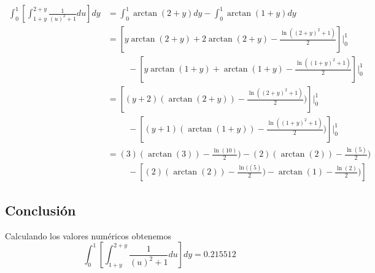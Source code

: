         \begin{align*}
            \int_0^1 \left[ \int_{1+y}^{2+y} \frac{1}{(u)^2 + 1}du \right] dy & = \int_0^1 \arctan(2+y) dy - \int_0^1 \arctan(1+y) dy \\
            & = \left[y \arctan(2 + y) + 2 \arctan(2 + y) - \frac{\ln((2 + y)^2 +1)}{2}\right]|_0^1 \\
            & \hspace{1cm} - \left[y \arctan(1 + y) + \arctan(1 + y) - \frac{\ln((1 + y)^2 +1)}{2}\right]|_0^1 \\
            & = \left[(y + 2)(\arctan(2 +y)) - \frac{\ln((2 + y)^2 +1)}{2})\right]|_0^1 \\
            & \hspace{1cm} -  \left[(y + 1)(\arctan(1 +y)) - \frac{\ln((1 + y)^2 +1)}{2})\right]|_0^1 \\
            & = (3)(\arctan(3)) - \frac{\ln(10)}{2}) - (2)(\arctan(2)) - \frac{\ln(5)}{2}) \\
            & \hspace{1cm} -\left[(2)(\arctan(2)) - \frac{\ln((5)}{2}) - \arctan(1) - \frac{\ln(2)}{2})\right]
        \end{align*}
    \subsection*{Conclusión}
        Calculando los valores numéricos obtenemos
        \begin{equation*}
            \boxed{ \int_0^1 \left[ \int_{1+y}^{2+y} \frac{1}{(u)^2 + 1}du \right] dy = 0.215512 }
        \end{equation*}